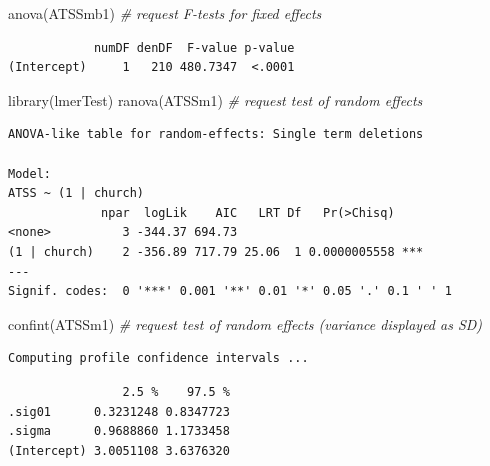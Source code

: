 \documentclass[
  11pt,
]{book}
\newenvironment{Shaded}{\begin{snugshade}}{\end{snugshade}}
\newcommand{\CommentTok}[1]{\textcolor[rgb]{0.56,0.35,0.01}{\textit{#1}}}
\newcommand{\FunctionTok}[1]{\textcolor[rgb]{0.00,0.00,0.00}{#1}}
\newcommand{\NormalTok}[1]{#1}
\begin{document}
\begin{Shaded}
\begin{Highlighting}[]
\FunctionTok{anova}\NormalTok{(ATSSmb1) }\CommentTok{\# request F{-}tests for fixed effects}
\end{Highlighting}
\end{Shaded}

\begin{verbatim}
            numDF denDF  F-value p-value
(Intercept)     1   210 480.7347  <.0001
\end{verbatim}

\begin{Shaded}
\begin{Highlighting}[]
\FunctionTok{library}\NormalTok{(lmerTest)}
\FunctionTok{ranova}\NormalTok{(ATSSm1) }\CommentTok{\# request test of random effects}
\end{Highlighting}
\end{Shaded}

\begin{verbatim}
ANOVA-like table for random-effects: Single term deletions

Model:
ATSS ~ (1 | church)
             npar  logLik    AIC   LRT Df   Pr(>Chisq)    
<none>          3 -344.37 694.73                          
(1 | church)    2 -356.89 717.79 25.06  1 0.0000005558 ***
---
Signif. codes:  0 '***' 0.001 '**' 0.01 '*' 0.05 '.' 0.1 ' ' 1
\end{verbatim}

\begin{Shaded}
\begin{Highlighting}[]
\FunctionTok{confint}\NormalTok{(ATSSm1) }\CommentTok{\# request test of random effects (variance displayed as SD)}
\end{Highlighting}
\end{Shaded}

\begin{verbatim}
Computing profile confidence intervals ...
\end{verbatim}

\begin{verbatim}
                2.5 %    97.5 %
.sig01      0.3231248 0.8347723
.sigma      0.9688860 1.1733458
(Intercept) 3.0051108 3.6376320
\end{verbatim}
\end{document}
